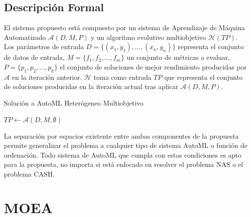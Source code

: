 \subsection{Descripci\'on Formal}
El sistema propuesto est\'a compuesto por un sistema de Aprendizaje de M\'aquina Automatizado $\mathcal{A}(D, M, P)$  y un algoritmo evolutivo multiobjetivo $\mathcal{H}(TP)$. Los par\'ametros de entrada $D = \{(x_1, y_1), ..., (x_n, y_n)\}$ representa el conjunto de datos de entrada, $M = \{f_1, f_2, ..., f_m\}$ un conjunto de m\'etricas a evaluar, $P = \{p_1, p_2, ..., p_k\}$ el conjunto de soluciones de mejor rendimiento producidas por  $\mathcal{A}$ en la iteraci\'on anterior. $\mathcal{H}$ toma como entrada $TP$ que representa el conjunto de soluciones producidas en la iteraci\'on actual tras aplicar $\mathcal{A}(D, M, P)$. 
\begin{algorithm}[ht]\caption{Soluci\'on a AutoML Heter\'ogeneo Multiobjetivo}
    $TP \gets \mathcal{A}(D, M, \emptyset)$ 
\end{algorithm}

La separaci\'on  por espacios existente entre ambas componentes de la propuesta permite generalizar el problema a cualquier tipo de sistema AutoML o funci\'on de ordenaci\'on. Todo sistema de AutoML que cumpla con estas condiciones es apto para la propuesta, no importa si est\'a enfocado en resolver el problema NAS o el problema CASH.

\section{MOEA}

